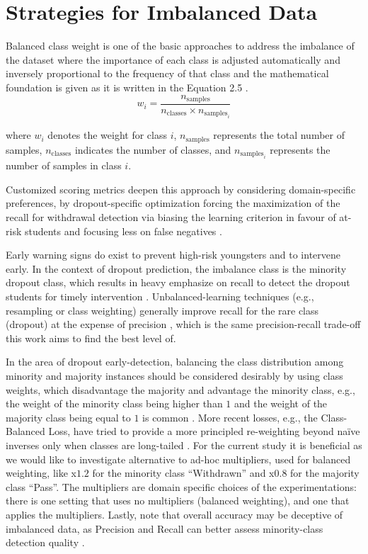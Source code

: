 \documentclass[ %
                    author={Carlos Duran Calle},
                supervisor={Dr. Felipe Campelo},
                    degree={MSc},
                     title={Comparative Machine Learning Analysis for Student Dropout Prediction in a Virtual Learning Environment},
                  subtitle={Incorporating Student Engagement and Socio-Economic Features},
                      type={},
                      year={2025}]{dissertation}
\begin{document}
\section{Strategies for Imbalanced Data}
Balanced class weight is one of the basic approaches to address the imbalance of the dataset where the importance of each class is adjusted automatically and inversely proportional to the frequency of that class and the mathematical foundation is given as it is written in the Equation 2.5 \cite{akor_hierarchical_2025}.
\begin{equation}
	w_{i} = \frac{n_{\text{samples}}}{n_{\text{classes}} \times n_{\text{samples}_{i}}}
	\tag{2.5}
\end{equation}
\begin{center}
	where $w_{i}$ denotes the weight for class $i$, $n_{\text{samples}}$ represents the total number of samples, 
	$n_{\text{classes}}$ indicates the number of classes, and $n_{\text{samples}_{i}}$ represents the number of samples in class $i$.
\end{center}

Customized scoring metrics deepen this approach by considering domain-specific preferences, by dropout-specific optimization forcing the maximization of the recall for withdrawal detection via biasing the learning criterion in favour of at-risk students and focusing less on false negatives \cite{orooji_predicting_2019}.

Early warning signs do exist to prevent high-risk youngsters and to intervene early. In the context of dropout prediction, the imbalance class is the minority dropout class, which results in heavy emphasize on recall to detect the dropout students for timely intervention \cite{lee_machine_2019}. Unbalanced-learning techniques (e.g., resampling or class weighting) generally improve recall for the rare class (dropout) at the expense of precision \cite{orooji_predicting_2019}, which is the same precision-recall trade-off this work aims to find the best level of.

In the area of dropout early-detection, balancing the class distribution among minority and majority instances should be considered desirably by using class weights, which disadvantage the majority and advantage the minority class, e.g., the weight of the minority class being higher than $1$ and the weight of the majority class being equal to $1$ is common \cite{hlosta_ouroboros_2017}. More recent losses, e.g., the Class-Balanced Loss, have tried to provide a more principled re-weighting beyond naïve inverses only when classes are long-tailed \cite{cui_class-balanced_2019}. For the current study it is beneficial as we would like to investigate alternative to ad-hoc multipliers, used for balanced weighting, like x$1.2$ for the minority class “Withdrawn” and x$0.8$ for the majority class “Pass”. The multipliers are domain specific choices of the experimentations: there is one setting that uses no multipliers (balanced weighting), and one that applies the multipliers. Lastly, note that overall accuracy may be deceptive of imbalanced data, as Precision and Recall can better assess minority-class detection quality \cite{saito_precision-recall_2015}.
\end{document}
